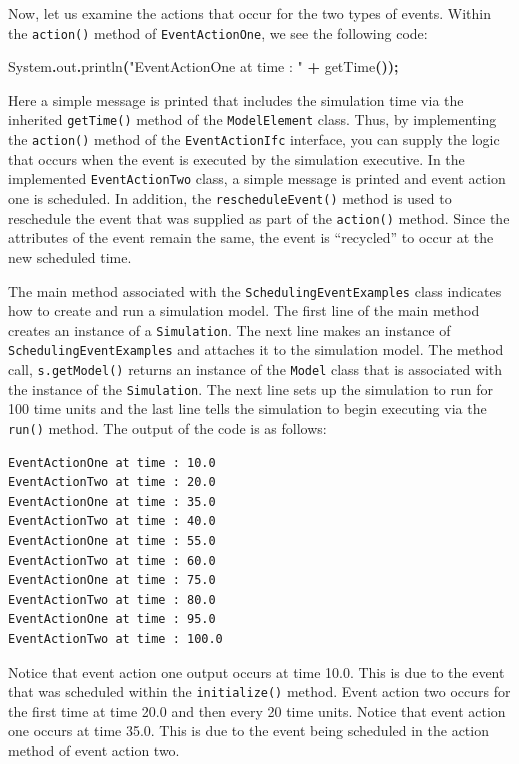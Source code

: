 \documentclass[
]{book}
\newenvironment{Shaded}{\begin{snugshade}}{\end{snugshade}}
\newcommand{\BuiltInTok}[1]{#1}
\newcommand{\FunctionTok}[1]{\textcolor[rgb]{0.00,0.00,0.00}{#1}}
\newcommand{\OperatorTok}[1]{\textcolor[rgb]{0.81,0.36,0.00}{\textbf{#1}}}
\newcommand{\StringTok}[1]{\textcolor[rgb]{0.31,0.60,0.02}{#1}}
\theoremstyle{definition}
\theoremstyle{definition}
\theoremstyle{definition}
\theoremstyle{definition}
\theoremstyle{remark}
\begin{document}
Now, let us examine the actions that occur for the two types of events. Within the \texttt{action()} method of \texttt{EventActionOne}, we see the following code:

\begin{Shaded}
\begin{Highlighting}[]
\BuiltInTok{System}\OperatorTok{.}\FunctionTok{out}\OperatorTok{.}\FunctionTok{println}\OperatorTok{(}\StringTok{"EventActionOne at time : "} \OperatorTok{+} \FunctionTok{getTime}\OperatorTok{());}
\end{Highlighting}
\end{Shaded}

Here a simple message is printed that includes the simulation time via the inherited \texttt{getTime()} method of the \texttt{ModelElement} class. Thus, by implementing the \texttt{action()} method of the \texttt{EventActionIfc} interface, you can supply the logic that occurs when the event is executed by the simulation executive. In the implemented \texttt{EventActionTwo} class, a simple message is printed and event action one is scheduled. In addition, the \texttt{rescheduleEvent()} method is used to reschedule the event that was supplied as part of the \texttt{action()} method. Since the attributes of the event remain the same,
the event is ``recycled'' to occur at the new scheduled time.

The main method associated with the \texttt{SchedulingEventExamples} class
indicates how to create and run a simulation model. The first line of the main method creates an instance of a \texttt{Simulation}. The next line makes an instance of
\texttt{SchedulingEventExamples} and attaches it to the simulation model. The
method call, \texttt{s.getModel()} returns an instance of the \texttt{Model} class that is
associated with the instance of the \texttt{Simulation}. The next line sets up the
simulation to run for 100 time units and the last line tells the simulation to
begin executing via the \texttt{run()} method. The output of the code is as follows:

\begin{verbatim}
EventActionOne at time : 10.0
EventActionTwo at time : 20.0
EventActionOne at time : 35.0
EventActionTwo at time : 40.0
EventActionOne at time : 55.0
EventActionTwo at time : 60.0
EventActionOne at time : 75.0
EventActionTwo at time : 80.0
EventActionOne at time : 95.0
EventActionTwo at time : 100.0
\end{verbatim}

Notice that event action one output occurs at time 10.0. This is due to the event that was scheduled within the \texttt{initialize()} method. Event action two occurs for the first time at time 20.0 and then every 20 time units. Notice that event action one occurs at time 35.0. This is due to the event being scheduled in the action method of event action two.
\end{document}
